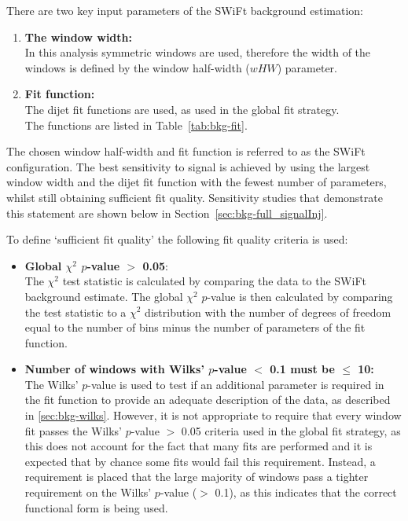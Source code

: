 There are two key input parameters of the SWiFt background estimation:
\begin{enumerate}[leftmargin=*]
\item \textbf{The window width:}\\
  In this analysis symmetric windows are used, therefore the width of the windows is defined by the window half-width ($wHW$) parameter.\vspace{0.5em}
\item \textbf{Fit function:}\\
  The dijet fit functions are used, as used in the global fit strategy. \\
  The functions are listed in Table~\ref{tab:bkg-fit}.
\end{enumerate}
The chosen window half-width and fit function is referred to as the SWiFt configuration.
The best sensitivity to signal is achieved by using the largest window width and the dijet fit function with the fewest number of parameters, whilst still obtaining sufficient fit quality.
Sensitivity studies that demonstrate this statement are shown below in Section~\ref{sec:bkg-full_signalInj}.

\noindent
To define `sufficient fit quality' the following fit quality criteria is used:
\begin{itemize}[leftmargin=*]  
\item \textbf{Global $\chi^{2}$ \mbox{$p$-value} $>$ 0.05}:\\
  The $\chi^{2}$ test statistic is calculated by comparing the data to the SWiFt background estimate.
  The global $\chi^{2}$ \mbox{$p$-value} is then calculated by comparing the test statistic
  to a $\chi^{2}$ distribution with the number of degrees of freedom equal to the number of bins
  minus the number of parameters of the fit function.\vspace{0.5em}
\item \textbf{Number of windows with Wilks' \mbox{$p$-value} $<$ 0.1 must be $\leq$ 10:}\\
  The Wilks' \mbox{$p$-value} is used to test if an additional parameter is required in the fit function
  to provide an adequate description of the data, as described in \ref{sec:bkg-wilks}. 
  However, it is not appropriate to require that every window fit passes the Wilks' $p$-value $>$ 0.05 criteria used in the global fit strategy,
  as this does not account for the fact that many fits are performed and it is expected that by chance some fits would fail this requirement.
  Instead, a requirement is placed that the large majority of windows pass a tighter requirement on the Wilks' $p$-value ($>$ 0.1),
  as this indicates that the correct functional form is being used.
\end{itemize}

